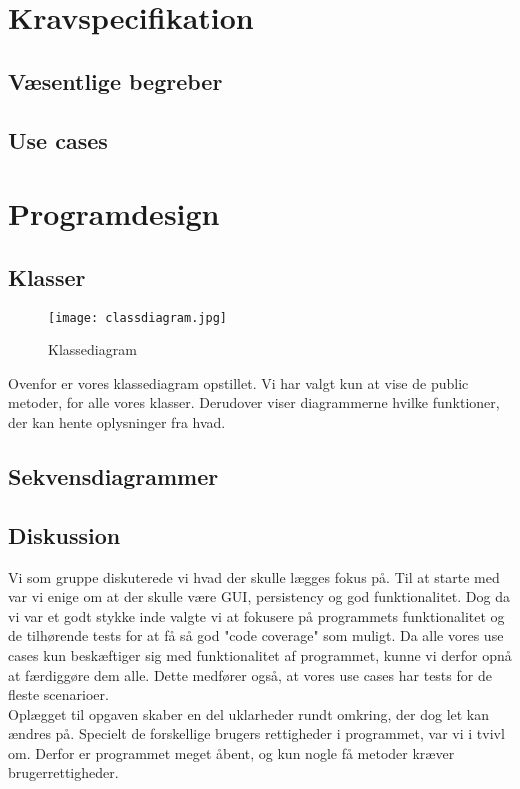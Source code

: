 \documentclass[a4paper,12pt]{article}
\begin{document}
\section{Kravspecifikation}
\subsection{Væsentlige begreber}
\subsection{Use cases}
\newpage
\section{Programdesign}
\subsection{Klasser}
\begin{figure}[h]
\centering
\texttt{[image: classdiagram.jpg]}
\caption{Klassediagram}
\label{fig: Klassediagram}
\end{figure}
Ovenfor er vores klassediagram opstillet. Vi har valgt kun at vise de public metoder, for alle vores klasser. Derudover viser diagrammerne hvilke funktioner, der kan hente oplysninger fra hvad. 
\subsection{Sekvensdiagrammer}
\subsection{Diskussion}
Vi som gruppe diskuterede vi hvad der skulle lægges fokus på. Til at starte med var vi enige om at der skulle være GUI, persistency og god funktionalitet. Dog da vi var et godt stykke inde valgte vi at fokusere på programmets funktionalitet og de tilhørende tests for at få så god "code coverage" som muligt. Da alle vores use cases kun beskæftiger sig med funktionalitet af programmet, kunne vi derfor opnå at færdiggøre dem alle. Dette medfører også, at vores use cases har tests for de fleste scenarioer.\\
Oplægget til opgaven skaber en del uklarheder rundt omkring, der dog let kan ændres på. Specielt de forskellige brugers rettigheder i programmet, var vi i tvivl om. Derfor er programmet meget åbent, og kun nogle få metoder kræver brugerrettigheder. 
\end{document}
